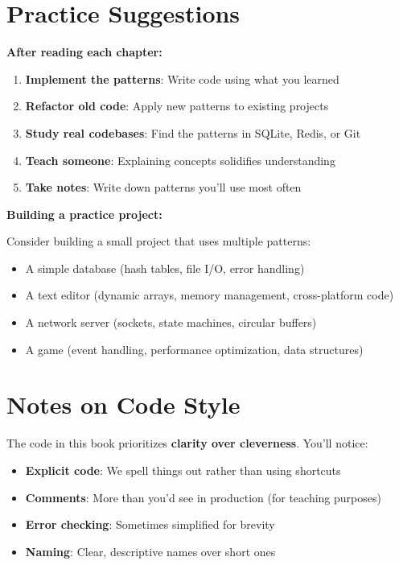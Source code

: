 \documentclass[11pt,openany]{book}
\begin{document}
\section*{Practice Suggestions}

\textbf{After reading each chapter:}

\begin{enumerate}
    \item \textbf{Implement the patterns}: Write code using what you learned
    \item \textbf{Refactor old code}: Apply new patterns to existing projects
    \item \textbf{Study real codebases}: Find the patterns in SQLite, Redis, or Git
    \item \textbf{Teach someone}: Explaining concepts solidifies understanding
    \item \textbf{Take notes}: Write down patterns you'll use most often
\end{enumerate}

\textbf{Building a practice project:}

Consider building a small project that uses multiple patterns:
\begin{itemize}
    \item A simple database (hash tables, file I/O, error handling)
    \item A text editor (dynamic arrays, memory management, cross-platform code)
    \item A network server (sockets, state machines, circular buffers)
    \item A game (event handling, performance optimization, data structures)
\end{itemize}

\section*{Notes on Code Style}

The code in this book prioritizes \textbf{clarity over cleverness}. You'll notice:

\begin{itemize}
    \item \textbf{Explicit code}: We spell things out rather than using shortcuts
    \item \textbf{Comments}: More than you'd see in production (for teaching purposes)
    \item \textbf{Error checking}: Sometimes simplified for brevity
    \item \textbf{Naming}: Clear, descriptive names over short ones
\end{itemize}
\end{document}
